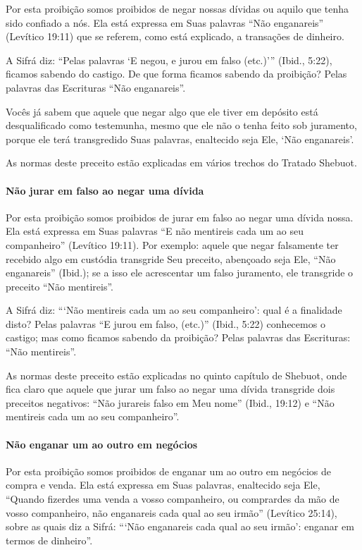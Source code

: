 Por esta proibição somos proibidos de negar nossas dívidas ou aquilo
que tenha sido confiado a nós. Ela está expressa em Suas palavras ``Não
enganareis'' (Levítico 19:11) que se referem, como está explicado, a
transações de dinheiro.

A Sifrá diz: ``Pelas palavras `E negou, e jurou em falso (etc.)'''
(Ibid., 5:22), ficamos sabendo do castigo. De que forma ficamos sabendo
da proibição? Pelas palavras das Escrituras ``Não enganareis''.

Vocês já sabem que aquele que negar algo que ele tiver em depósito está
desqualificado como testemunha, mesmo que ele não o tenha feito sob
juramento, porque ele terá transgredido Suas palavras, enaltecido seja
Ele, `Não enganareis'.

As normas deste preceito estão explicadas em vários trechos do Tratado
Shebuot.

\paragraph{Não jurar em falso ao negar uma dívida}

Por esta proibição somos proibidos de jurar em falso ao negar uma dívida
nossa. Ela está expressa em Suas palavras ``E não mentireis cada um ao
seu companheiro'' (Levítico 19:11). Por exemplo: aquele que negar
falsamente ter recebido algo em custódia transgride Seu preceito,
abençoado seja Ele, ``Não enganareis'' (Ibid.); se a isso ele
acrescentar um falso juramento, ele transgride o preceito ``Não
mentireis''.

A Sifrá diz: ```Não mentireis cada um ao seu companheiro': qual é a
finalidade disto? Pelas palavras ``E jurou em falso, (etc.)'' (Ibid.,
5:22) conhecemos o castigo; mas como ficamos sabendo da proibição? Pelas
palavras das Escrituras: ``Não mentireis''.

As normas deste preceito estão explicadas no quinto capítulo de
Shebuot, onde fica claro que aquele que jurar um falso ao negar uma
dívida transgride dois preceitos negativos: ``Não jurareis falso em Meu
nome'' (Ibid., 19:12) e ``Não mentireis cada um ao seu companheiro''.

\paragraph{Não enganar um ao outro em negócios}

Por esta proibição somos proibidos de enganar um ao outro em negócios
de compra e venda. Ela está expressa em Suas palavras, enaltecido seja
Ele, ``Quando fizerdes uma venda a vosso companheiro, ou comprardes da
mão de vosso companheiro, não enganareis cada qual ao seu irmão'' (Levítico
25:14), sobre as quais diz a Sifrá: ```Não enganareis cada qual ao seu
irmão': enganar em termos de dinheiro''.

